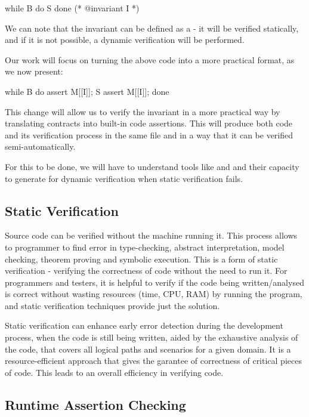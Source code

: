\begin{gospel}
    while B do S done
    (* @invariant I *)
\end{gospel}

We can note that the invariant  can be defined as a \monitor {} - it will be verified statically, 
and if it is not possible, a dynamic verification will be performed.

Our work will focus on turning the above code into a more practical format, as we now present:

\begin{gospel}
    while B do
        assert M[[I]];
        S
        assert M[[I]];
    done
\end{gospel}

This change will allow us to verify the invariant in a more practical way by translating contracts 
into built-in code assertions. This will produce both code and its verification process in the 
same file and in a way that it can be verified semi-automatically. 

For this to be done, we will have to understand tools like \cameleer and \ortac and their capacity 
to generate \monitors for dynamic verification when static verification fails.

\subsection{Static Verification}
\label{sub:static_verification}

Source code can be verified without the machine running it. This process allows to programmer 
to find error in type-checking, abstract interpretation, model checking, theorem proving and symbolic execution.
This is a form of static verification - verifying the correctness of code without the need to run it.
For programmers and testers, it is helpful to verify if the code being written/analysed is correct without 
wasting resources (time, CPU, RAM) by running the program, and static verification techniques provide just the solution.

Static verification can enhance early error detection during the development process, when the code is still 
being written, aided by the exhaustive analysis of the code, that covers all logical paths and scenarios for 
a given domain. It is a resource-efficient approach that gives the garantee of correctness of critical 
pieces of code. This leads to an overall efficiency in verifying code.

\subsection{Runtime Assertion Checking}
\label{sub:rac}

